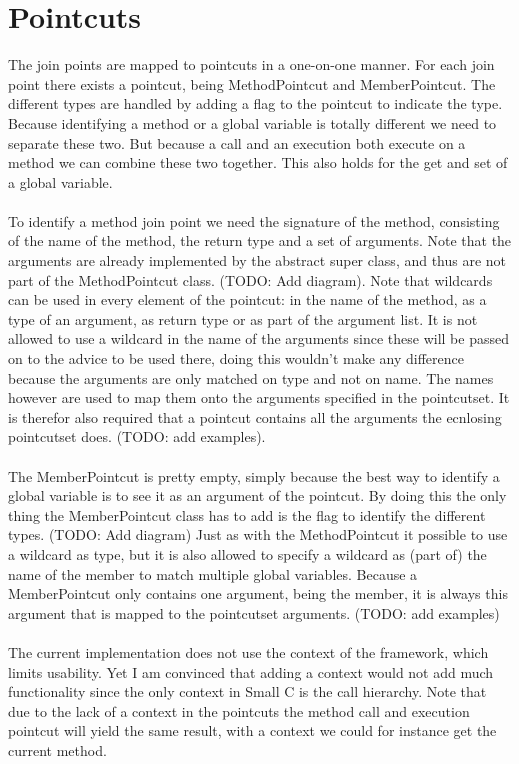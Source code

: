 \documentclass[a4paper]{report}
\begin{document}
\section{Pointcuts}
The join points are mapped to pointcuts in a one-on-one manner. For each join point there exists a pointcut, being MethodPointcut and MemberPointcut. The different types are handled by adding a flag to the pointcut to indicate the type. Because identifying a method or a global variable is totally different we need to separate these two. But because a call and an execution both execute on a method we can combine these two together. This also holds for the get and set of a global variable.\\
\\
To identify a method join point we need the signature of the method, consisting of the name of the method, the return type and a set of arguments. Note that the arguments are already implemented by the abstract super class, and thus are not part of the MethodPointcut class. (TODO: Add diagram). Note that wildcards can be used in every element of the pointcut: in the name of the method, as a type of an argument, as  return type or as part of the argument list. It is not allowed to use a wildcard in the name of the arguments since these will be passed on to the advice to be used there, doing this wouldn't make any difference because the arguments are only matched on type and not on name. The names however are used to map them onto the arguments specified in the pointcutset. It is therefor also required that a pointcut contains all the arguments the ecnlosing pointcutset does. (TODO: add examples).\\
\\
The MemberPointcut is pretty empty, simply because the best way to identify a global variable is to see it as an argument of the pointcut. By doing this the only thing the MemberPointcut class has to add is the flag to identify the different types. (TODO: Add diagram) Just as with the MethodPointcut it possible to use a wildcard as type, but it is also allowed to specify a wildcard as (part of) the name of the member to match multiple global variables. Because a MemberPointcut only contains one argument, being the member, it is always this argument that is mapped to the pointcutset arguments. (TODO: add examples)\\
\\
The current implementation does not use the context of the framework, which limits usability. Yet I am convinced that adding a context would not add much functionality since the only context in Small C is the call hierarchy. Note that due to the lack of a context in the pointcuts the method call and execution pointcut will yield the same result, with a context we could for instance get the current method.
\end{document}

